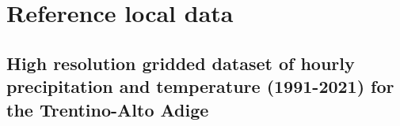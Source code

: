 \chapter{Reference local data}

\ifpdf
    \graphicspath{{Chapter3/Figs/Raster/}{Chapter3/Figs/PDF/}{Chapter3/Figs/}}
\else
    \graphicspath{{Chapter3/Figs/Vector/}{Chapter3/Figs/}}
\fi

\section{High resolution gridded dataset of hourly precipitation and temperature (1991-2021) for the Trentino-Alto Adige\label{section3.1}}






